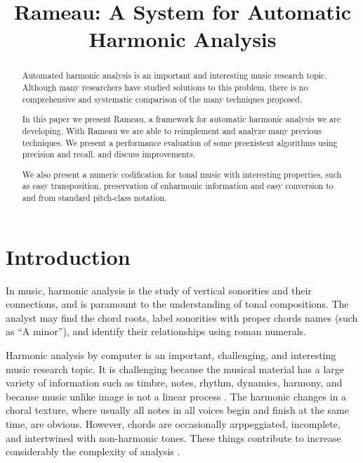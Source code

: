 \documentclass{article}
\title{Rameau: A System for Automatic Harmonic Analysis}
\begin{document}
\graphicspath{{figs/}{data/}}
\maketitle

\begin{abstract}

  Automated harmonic analysis is an important and interesting music
  research topic. Although many researchers have studied solutions to
  this problem, there is no comprehensive and systematic comparison of
  the many techniques proposed.

  In this paper we present Rameau, a framework for automatic harmonic
  analysis we are developing. With Rameau we are able to reimplement
  and analyze many previous techniques. We present a performance
  evaluation of some preexistent algorithms using precision and
  recall, and discuss improvements.

  We also present a numeric codification for tonal music with
  interesting properties, such as easy transposition, preservation of
  enharmonic information and easy conversion to and from standard
  pitch-class notation.

\end{abstract}

\section{Introduction}
\label{sec:introduction}

In music, harmonic analysis is the study of vertical sonorities and
their connections, and is paramount to the understanding of tonal
compositions. The analyst may find the chord roots, label
sonorities with proper chords names (such as ``A minor''), and
identify their relationships using roman numerals.

Harmonic analysis by computer is an important, challenging, and
interesting music research topic. It is challenging because the
musical material has a large variety of information such as timbre,
notes, rhythm, dynamics, harmony, and because music unlike image is not a
linear process \cite{mouton.ea:numeric}. The harmonic changes in a choral
texture, where usually all notes in all voices begin and finish at the
same time, are obvious. However, chords are occasionally arppeggiated,
incomplete, and intertwined with non-harmonic tones. These things
contribute to increase considerably the complexity of analysis
\cite{pardo.ea:automated}.
\end{document}
